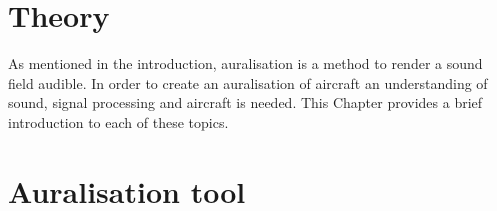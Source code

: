 

\chapter{Theory}\label{chapter:theory}
As mentioned in the introduction, auralisation is a method to render a sound
field audible. In order to create an auralisation of aircraft an understanding
of sound, signal processing and aircraft is needed. This Chapter provides a
brief introduction to each of these topics.

\newpage
\newpage
\newpage
\newpage
\newpage
% 

\chapter{Auralisation tool}\label{chapter:tool}

\newpage
\newpage









